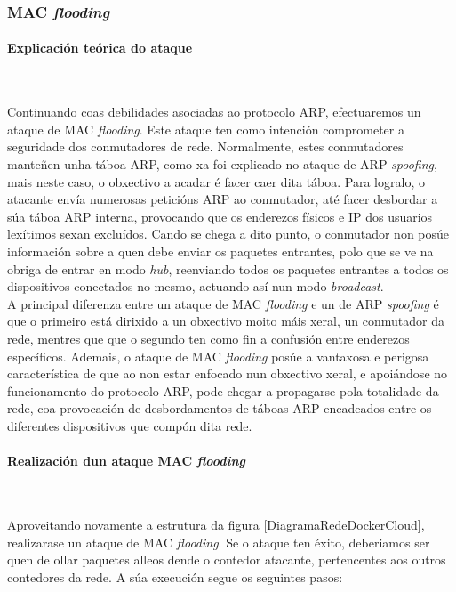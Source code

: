 \subsubsection{\gls{MAC} \textit{flooding}}

\paragraph{Explicación teórica do ataque}~~

Continuando coas debilidades asociadas ao protocolo \gls{ARP}, efectuaremos un ataque de \gls{MAC} \textit{flooding}. Este ataque ten como intención comprometer a seguridade dos conmutadores de rede. Normalmente, estes conmutadores manteñen unha táboa \gls{ARP}, como xa foi explicado no ataque de \gls{ARP} \textit{spoofing}, mais neste caso, o obxectivo a acadar é facer caer dita táboa. Para logralo, o atacante envía numerosas peticións \gls{ARP} ao conmutador, até facer desbordar a súa táboa \gls{ARP} interna, provocando que os enderezos físicos e \gls{IP} dos usuarios lexítimos sexan excluídos. Cando se chega a dito punto, o conmutador non posúe información sobre a quen debe enviar os paquetes entrantes, polo que se ve na obriga de entrar en modo \textit{hub}, reenviando todos os paquetes entrantes a todos os dispositivos conectados no mesmo, actuando así nun modo \textit{broadcast}.\\

A principal diferenza entre un ataque de \gls{MAC} \textit{flooding} e un de \gls{ARP} \textit{spoofing} é que o primeiro está dirixido a un obxectivo moito máis xeral, un conmutador da rede, mentres que que o segundo ten como fin a confusión entre enderezos específicos. Ademais, o ataque de \gls{MAC} \textit{flooding} posúe a vantaxosa e perigosa característica de que ao non estar enfocado nun obxectivo xeral, e apoiándose no funcionamento do protocolo \gls{ARP}, pode chegar a propagarse pola totalidade da rede, coa provocación de desbordamentos de táboas \gls{ARP} encadeados entre os diferentes dispositivos que compón dita rede.

\paragraph{Realización dun ataque \gls{MAC} \textit{flooding}}~~

Aproveitando novamente a estrutura da figura \ref{DiagramaRedeDockerCloud}, realizarase un ataque de \gls{MAC} \textit{flooding}. Se o ataque ten éxito, deberiamos ser quen de ollar paquetes alleos dende o contedor atacante, pertencentes aos outros contedores da rede. A súa execución segue os seguintes pasos:

